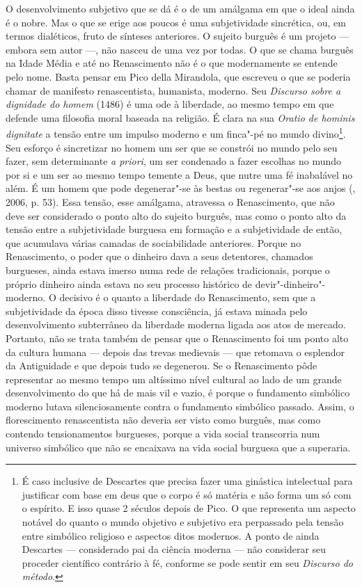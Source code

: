 O desenvolvimento subjetivo que se dá é o de um amálgama em que o ideal
ainda é o nobre. Mas o que se erige aos poucos é uma subjetividade
sincrética, ou, em termos dialéticos, fruto de sínteses anteriores. O
sujeito burguês é um projeto --- embora sem autor ---, não nasceu de uma
vez por todas. O que se chama burguês na Idade Média e até no
Renascimento não é o que modernamente se entende pelo nome. Basta pensar
em Pico della Mirandola, que escreveu o que se poderia chamar de
manifesto renascentista, humanista, moderno. Seu \emph{Discurso sobre a
dignidade do homem} (1486) é uma ode à liberdade, ao mesmo tempo em
que defende uma filosofia moral baseada na religião. É clara na sua
\emph{Oratio de hominis dignitate} a tensão entre um impulso moderno e
um finca"-pé no mundo divino\footnote{É caso inclusive de Descartes que
  precisa fazer uma ginástica intelectual para justificar com base em
  deus que o corpo é só matéria e não forma um só com o espírito. E isso
  quase 2 séculos depois de Pico. O que representa um aspecto notável do
  quanto o mundo objetivo e subjetivo era perpassado pela tensão entre
  simbólico religioso e aspectos ditos modernos. A ponto de ainda
  Descartes --- considerado pai da ciência moderna --- não considerar seu
  proceder científico contrário à fé, conforme se pode sentir em seu
  \emph{Discurso do método}.}. Seu esforço é sincretizar no homem
um ser que se constrói no mundo pelo seu fazer, sem determinante \emph{a
priori}, um ser condenado a fazer escolhas no mundo por si e um ser ao
mesmo tempo temente a Deus, que nutre uma fé inabalável no além. É um
homem que pode degenerar"-se às bestas ou regenerar"-se aos anjos
(, 2006, p. 53). Essa tensão, esse amálgama, atravessa o
Renascimento, que não deve ser considerado o ponto alto do sujeito
burguês, mas como o ponto alto da tensão entre a subjetividade burguesa
em formação e a subjetividade de então, que acumulava várias camadas de
sociabilidade anteriores. Porque no Renascimento, o poder que o dinheiro
dava a seus detentores, chamados burgueses, ainda estava imerso numa
rede de relações tradicionais, porque o próprio dinheiro ainda estava no
seu processo histórico de devir"-dinheiro"-moderno. O decisivo é o quanto
a liberdade do Renascimento, sem que a subjetividade da época disso
tivesse consciência, já estava minada pelo desenvolvimento subterrâneo
da liberdade moderna ligada aos atos de mercado. Portanto, não se trata
também de pensar que o Renascimento foi um ponto alto da cultura humana
--- depois das trevas medievais --- que retomava o esplendor da
Antiguidade e que depois tudo se degenerou. Se o Renascimento pôde
representar ao mesmo tempo um altíssimo nível cultural ao lado de um
grande desenvolvimento do que há de mais vil e vazio, é porque o
fundamento simbólico moderno lutava silenciosamente contra o fundamento
simbólico passado. Assim, o florescimento renascentista não deveria ser
visto como burguês, mas como contendo tensionamentos burgueses, porque a
vida social transcorria num universo simbólico que não se encaixava na
vida social burguesa que a superaria.

